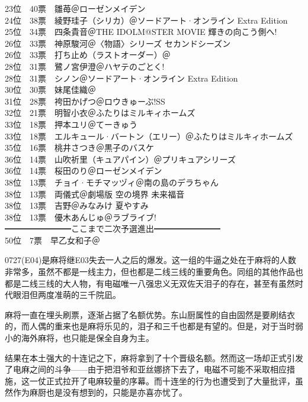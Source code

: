 {    23位　40票　雛苺＠ローゼンメイデン\\
    24位　38票　綾野珪子（シリカ）＠ソードアート·オンライン Extra Edition\\
    25位　34票　四条貴音＠THE IDOLM@STER MOVIE 輝きの向こう側へ!\\
    26位　33票　神原駿河＠〈物語〉シリーズ セカンドシーズン\\
    26位　33票　打ち止め（ラストオーダー）＠\Railgan\\
    28位　31票　鷺ノ宮伊澄＠ハヤテのごとく!\\
    28位　31票　シノン＠ソードアート·オンライン Extra Edition\\
    30位　30票　妹尾佳織＠\Saki\\
    31位　28票　袴田かげつ＠ロウきゅーぶ!SS\\
    32位　21票　明智小衣＠ふたりはミルキィホームズ\\
    33位　18票　押本ユリ＠てーきゅう\\
    33位　18票　エルキュール·バートン（エリー）＠ふたりはミルキィホームズ\\
    35位　16票　桃井さつき＠黒子のバスケ\\
    36位　14票　山吹祈里（キュアパイン）＠プリキュアシリーズ\\
    36位　14票　桜田のり＠ローゼンメイデン\\
    38位　13票　チョイ·モチマッヅィ＠南の島のデラちゃん\\
    38位　13票　両儀式＠劇場版 空の境界 未来福音\\
    38位　13票　吉野＠みなみけ 夏やすみ\\
    38位　13票　優木あんじゅ＠ラブライブ!\\
    ━━━━━━━━ここまで二次予選進出━━━━━━━━\\
    50位　7票　早乙女和子＠\Madomagi
}

0727(E04)是麻将继E03失去一人之后的爆发。这一组的牛逼之处在于麻将的人数非常多，虽然不都是一线主力，但也都是二线三线的重要角色。同组的其他作品也都是二线三线的大人物，有电磁唯一八强忠义无双佐天泪子的存在，甚至有虽然时代眼泪但两度准萌的三千院凪。

麻将一直在埋头刷票，逐渐占据了名额优势。东山厨属性的自由固然是要刷结衣的，而人偶的重来也是麻将乐见的，泪子和三千也都是有望的。但是，对于当时弱小的海外麻将，也只能是保全自身为主。

结果在本土强大的十连记之下，麻将拿到了十个晋级名额。然而这一场却正式引发了电麻之间的斗争——由于把泪爷和亚丝娜挤下去了，电磁不可能不采取相应措施，这一仗正式拉开了电麻较量的序幕。而十连坐的行为也遭受到了大量批评，虽然作为麻厨也是没有想到的，只能是亦喜亦忧了。

